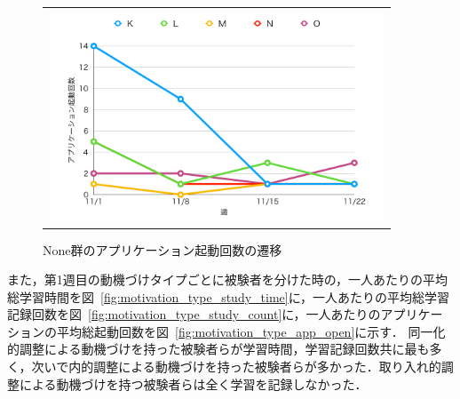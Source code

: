 \begin{figure}[htb]
\begin{center}
\begin{tabular}{c}
  \begin{minipage}[htb]{\linewidth}
  \begin{center}
  \includegraphics[width=10cm]{images/7/none_app_open.png}
  \caption{None群のアプリケーション起動回数の遷移}
  \label{fig:none_app_open}
  \end{center}
  \end{minipage}

\end{tabular}
\end{center}
\end{figure}

また，第1週目の動機づけタイプごとに被験者を分けた時の，一人あたりの平均総学習時間を図~\ref{fig:motivation_type_study_time}に，一人あたりの平均総学習記録回数を図~\ref{fig:motivation_type_study_count}に，一人あたりのアプリケーションの平均総起動回数を図~\ref{fig:motivation_type_app_open}に示す．
同一化的調整による動機づけを持った被験者らが学習時間，学習記録回数共に最も多く，次いで内的調整による動機づけを持った被験者らが多かった．取り入れ的調整による動機づけを持つ被験者らは全く学習を記録しなかった．

